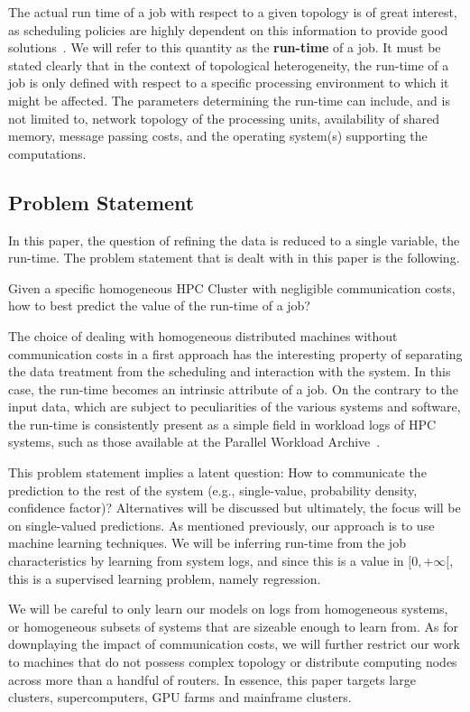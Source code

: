 \documentclass{article}
\begin{document}
The actual run time of a job with respect to a given topology is of great interest, as scheduling policies are highly dependent on this information to provide good solutions~\cite{handbook-of-scheduling}. We will refer to this quantity as the \textbf{run-time} of a job.
It must be stated clearly that in the context of topological heterogeneity, the run-time of a job is only defined with respect to a specific processing environment to which it might be affected.
The parameters determining the run-time can include, and is not limited to, network topology of the processing units, availability of shared memory, message passing costs, and the operating system(s) supporting the computations.

\subsection{Problem Statement}
In this paper, the question of refining the data is reduced to a single variable, the run-time. The problem statement that is dealt with in this paper is the following.

Given a specific homogeneous HPC Cluster with negligible communication costs, how to best predict the value of the run-time of a job?

The choice of dealing with homogeneous distributed machines without communication costs in a first approach has the interesting property of separating the data treatment from the scheduling and interaction with the system.
In this case, the run-time becomes an intrinsic attribute of a job.
On the contrary to the input data, which are subject to peculiarities of the various systems and software, the run-time is consistently present as a simple field in workload logs of HPC systems, such as those available at the Parallel Workload Archive~\cite{workloadarchive}.

This problem statement implies a latent question: How to communicate the prediction to the rest of the system (e.g., single-value, probability density, confidence factor)? Alternatives will be discussed but ultimately, the focus will be on single-valued predictions.
As mentioned previously, our approach is to use machine learning techniques. We will be inferring run-time from the job characteristics by learning from system logs, and since this is a value in $[0,+\infty [$, this is a supervised learning problem, namely regression.

We will be careful to only learn our models on logs from homogeneous systems, or homogeneous subsets of systems that are sizeable enough to learn from.
As for downplaying the impact of communication costs, we will further restrict our work to machines that do not possess complex topology or distribute computing nodes across more than a handful of routers.
In essence, this paper targets large clusters, supercomputers, GPU farms and mainframe clusters.
\end{document}
